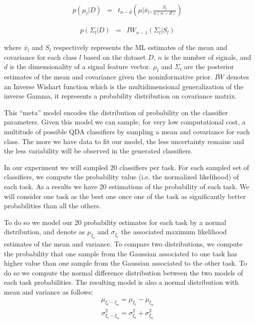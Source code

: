\begin{eqnarray}
p(\mu_l|D) & = & t_{n-d}(\mu| \bar{x}_l, \frac{S_l}{n(n-d)})
\label{eq:jeffreysmean}
\end{eqnarray}

\begin{eqnarray}
p(\Sigma_l|D) & = & IW_{n-1}(\Sigma_l | S_l)
\label{eq:jeffreyscov}
\end{eqnarray}

where $\bar{x}_l$ and $S_l$ respectively represents the ML estimates of the mean and covariance for each class $l$ based on the dataset $D$, $n$ is the number of signals, and $d$ is the dimensionality of a signal feature vector.
$\mu_l$ and $\Sigma_l$ are the posterior estimates of the mean and covariance given the noninformative prior. $IW$ denotes an Inverse Wishart function which is the multidimensional generalization of the inverse Gamma, it represents a probability distribution on covariance matrix.

This ``meta'' model encodes the distribution of probability on the classifier parameters. Given this model we can sample, for very low computational cost, a multitude of possible QDA classifiers by sampling a mean and covariance for each class. The more we have data to fit our model, the less uncertainty remains and the less variability will be observed in the generated classifiers. 

In our experiment we will sampled 20 classifiers per task. For each sampled set of classifiers, we compute the probability value (i.e. the normalized likelihood) of each task. As a results we have 20 estimations of the probability of each task. We will consider one task as the best one once one of the task as significantly better probabilities than all the others. 

To do so we model our 20 probability estimates for each task by a normal distribution, and denote as $\mu_{\xi_t}$ and $\sigma_{\xi_t}$ the associated maximum likelihood estimates of the mean and variance. To compare two distributions, we compute the probability that one sample from the  Gaussian associated to one task has higher value than one sample from the Gaussian associated to the other task. To do so we compute the normal difference distribution between the two models of each task probabilities. The resulting model is also a normal distribution with mean and variance as follows:
%
\begin{eqnarray}
\mu_{\xi_t - \xi_u} = \mu_{\xi_t} - \mu_{\xi_u} 
\label{eq:meandiffgaussian}
\end{eqnarray}
%
\begin{eqnarray}
\sigma^2_{\xi_t - \xi_u} = \sigma^2_{\xi_t} + \sigma^2_{\xi_u}
\label{eq:variancediffgaussian}
\end{eqnarray}

